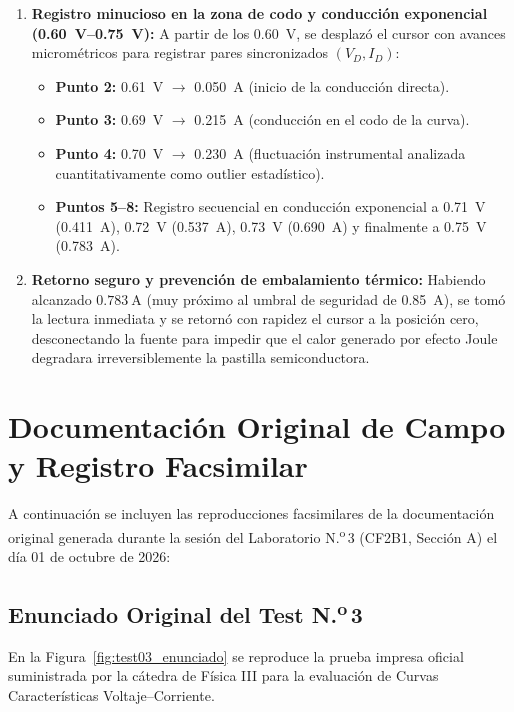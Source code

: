 \begin{appendices}
\begin{enumerate}
    \item \textbf{Registro minucioso en la zona de codo y conducción exponencial (\qtyrange{0,60}{0,75}{\volt}):}  
    A partir de los \qty{0,60}{\volt}, se desplazó el cursor con avances micrométricos para registrar pares sincronizados $(V_D, I_D)$:
    \begin{itemize}
        \item \textbf{Punto 2:} \qty{0,61}{\volt} $\longrightarrow$ \qty{0,050}{\ampere} (inicio de la conducción directa).
        \item \textbf{Punto 3:} \qty{0,69}{\volt} $\longrightarrow$ \qty{0,215}{\ampere} (conducción en el codo de la curva).
        \item \textbf{Punto 4:} \qty{0,70}{\volt} $\longrightarrow$ \qty{0,230}{\ampere} (fluctuación instrumental analizada cuantitativamente como outlier estadístico).
        \item \textbf{Puntos 5--8:} Registro secuencial en conducción exponencial a \qty{0,71}{\volt} (\qty{0,411}{\ampere}), \qty{0,72}{\volt} (\qty{0,537}{\ampere}), \qty{0,73}{\volt} (\qty{0,690}{\ampere}) y finalmente a \qty{0,75}{\volt} (\qty{0,783}{\ampere}).
    \end{itemize}
    
    \item \textbf{Retorno seguro y prevención de embalamiento térmico:} Habiendo alcanzado $\qty{0,783}{\ampere}$ (muy próximo al umbral de seguridad de \qty{0,85}{\ampere}), se tomó la lectura inmediata y se retornó con rapidez el cursor a la posición cero, desconectando la fuente para impedir que el calor generado por efecto Joule degradara irreversiblemente la pastilla semiconductora.
\end{enumerate}

\section{Documentación Original de Campo y Registro Facsimilar}
\label{anexo:hoja_datos}

A continuación se incluyen las reproducciones facsimilares de la documentación original generada durante la sesión del Laboratorio \texorpdfstring{N.\textsuperscript{o}\,3}{Nro. 3} (CF2B1, Sección A) el día 01 de octubre de 2026:

\subsection{Enunciado Original del Test \texorpdfstring{N.\textsuperscript{o}\,3}{Nro. 3}}
En la Figura~\ref{fig:test03_enunciado} se reproduce la prueba impresa oficial suministrada por la cátedra de Física III para la evaluación de Curvas Características Voltaje--Corriente.


\end{appendices}

